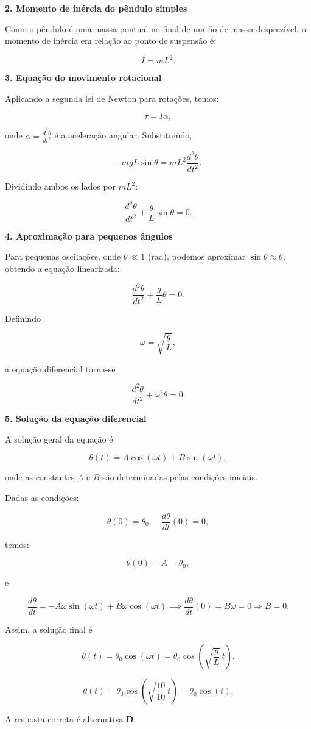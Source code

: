 \documentclass[a4paper,12pt]{article}
\begin{document}
\begin{flushleft}
\bigskip

\textbf{2. Momento de inércia do pêndulo simples}

Como o pêndulo é uma massa pontual no final de um fio de massa desprezível, o momento de inércia em relação ao ponto de suspensão é:

\[
\boxed{I = m L^2.}
\]

\bigskip

\textbf{3. Equação do movimento rotacional}

Aplicando a segunda lei de Newton para rotações, temos:

\[
\boxed{\tau = I \alpha,}
\]

onde \(\alpha = \frac{d^2 \theta}{dt^2}\) é a aceleração angular. Substituindo,

\[
- m g L \sin\theta = m L^2 \frac{d^2 \theta}{dt^2}.
\]

Dividindo ambos os lados por \(m L^2\):

\[
\boxed{\frac{d^2 \theta}{dt^2} + \frac{g}{L} \sin\theta = 0.}
\]

\bigskip

\textbf{4. Aproximação para pequenos ângulos}

Para pequenas oscilações, onde \(\theta \ll 1\) (rad), podemos aproximar \(\sin\theta \approx \theta\), obtendo a equação linearizada:

\[
\boxed{\frac{d^2 \theta}{dt^2} + \frac{g}{L} \theta = 0.}
\]

Definindo

\[
\omega = \sqrt{\frac{g}{L}},
\]

a equação diferencial torna-se

\[
\boxed{\frac{d^2 \theta}{dt^2} + \omega^2 \theta = 0.}
\]

\bigskip

\textbf{5. Solução da equação diferencial}

A solução geral da equação é

\[
\boxed{\theta(t) = A \cos(\omega t) + B \sin(\omega t),}
\]

onde as \colorbox{green!30}{constantes \(A\) e \(B\) são determinadas pelas condições iniciais.}

Dadas as condições:

\[
\theta(0) = \theta_0, \quad \frac{d\theta}{dt}(0) = 0,
\]

temos:

\[
\theta(0) = A = \theta_0,
\]

e

\[
\frac{d\theta}{dt} = - A \omega \sin(\omega t) + B \omega \cos(\omega t) \implies \frac{d\theta}{dt}(0) = B \omega = 0 \Rightarrow B = 0.
\]

Assim, a solução final é

\[
\theta(t) = \theta_0 \cos(\omega t) = \theta_0 \cos\left(\sqrt{\frac{g}{L}} \, t \right).
\]

\[
\boxed{
\theta(t) = \theta_0 \cos\left(\sqrt{\frac{10}{10}} \, t \right) = \theta_0 \cos\left(t \right).
}
\]

A resposta correta é alternativa \colorbox{green!50}{\textbf{D}}.
\end{flushleft}
\end{document}
